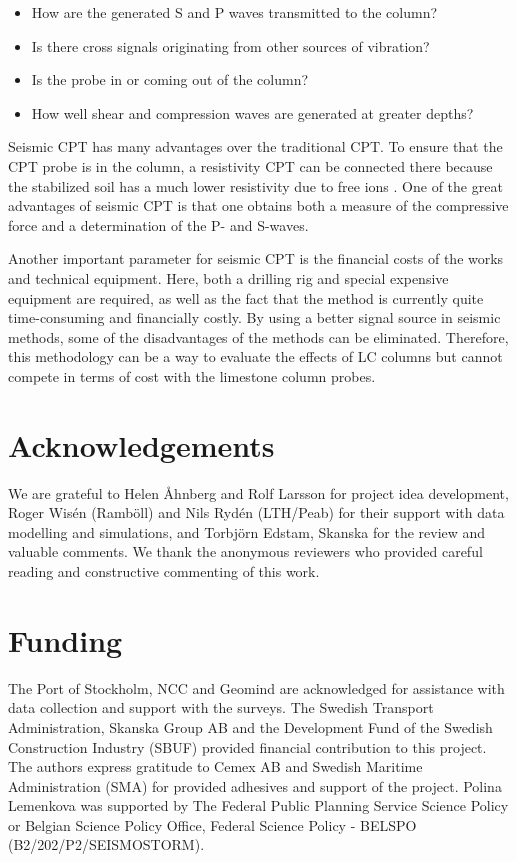 \documentclass[final,3p,times,twocolumn]{elsarticle}
\begin{document}
\begin{itemize}
\setlength\itemsep{-0.1cm}
	\item How are the generated S and P waves transmitted to the column? 
	\item Is there cross signals originating from other sources of vibration?
	\item Is the probe in or coming out of the column?
	\item How well shear and compression waves are generated at greater depths? 
\end{itemize}
    
Seismic CPT has many advantages over the traditional CPT. To ensure that the CPT probe is in the column, a resistivity CPT can be connected there because the stabilized soil has a much lower resistivity due to free ions \cite{Dahlinetal1999}. One of the great advantages of seismic CPT is that one obtains both a measure of the compressive force and a determination of the P- and S-waves. 

Another important parameter for seismic CPT is the financial costs of the works and technical equipment. Here, both a drilling rig and special expensive equipment are required, as well as the fact that the method is currently quite time-consuming and financially costly. By using a better signal source in seismic methods, some of the disadvantages of the methods can be eliminated. Therefore, this methodology can be a way to evaluate the effects of LC columns but cannot compete in terms of cost with the limestone column probes.

\section{Acknowledgements}
We are grateful to Helen Åhnberg and Rolf Larsson for project idea development, Roger Wisén (Ramböll) and Nils Rydén (LTH/Peab) for their support with data modelling and simulations, and Torbjörn Edstam, Skanska for the review and valuable comments. We thank the anonymous reviewers who provided careful reading and constructive commenting of this work. 

\section{Funding}
The Port of Stockholm, NCC and Geomind are acknowledged for assistance with data collection and support with the surveys. The Swedish Transport Administration, Skanska Group AB and the Development Fund of the Swedish Construction Industry (SBUF) provided financial contribution to this project. The authors express gratitude to Cemex AB and Swedish Maritime Administration (SMA) for provided adhesives and support of the project. Polina Lemenkova was supported by The Federal Public Planning Service Science Policy or Belgian Science Policy Office, Federal Science Policy - BELSPO (B2/202/P2/SEISMOSTORM).
\end{document}

